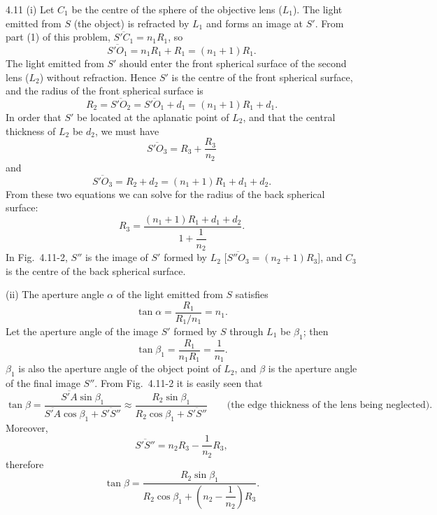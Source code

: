 \begin{solution}{4.11}
(i) Let $C_1$ be the centre of the sphere of the objective lens ($L_1$). The light emitted from $S$
(the object) is refracted by $L_1$ and forms an image at $S'$. From part (1) of this problem,
$\overline{S'C_1}=n_1R_1$, so
\begin{equation*}
\overline{S'O_1} = n_1R_1+R_1 = (n_1+1)R_1.
\end{equation*}
The light emitted from $S'$ should enter the front spherical surface of the second lens ($L_2$)
without refraction. Hence $S'$ is the centre of the front spherical surface, and the radius of the
front spherical surface is
\begin{equation*}
R_2 = \overline{S'O_2} = \overline{S'O_1}+d_1 = (n_1+1)R_1+d_1.
\end{equation*}
In order that $S'$ be located at the aplanatic point of $L_2$, and that the central thickness of
$L_2$ be $d_2$, we must have
\begin{equation*}
\overline{S'O_3} = R_3+\frac{R_3}{n_2}
\end{equation*}
and
\begin{equation*}
\overline{S'O_3} = R_2+d_2 = (n_1+1)R_1+d_1+d_2.
\end{equation*}
From these two equations we can solve for the radius of the back spherical surface:
\begin{equation*}
R_3 = \frac{(n_1+1)R_1+d_1+d_2}{1+\dfrac{1}{n_2}}.
\end{equation*}
In Fig.~4.11-2, $S''$ is the image of $S'$ formed by $L_2$ [$\overline{S''O_3}=(n_2+1)R_3$], and
$C_3$ is the centre of the back spherical surface.

(ii) The aperture angle $\alpha$ of the light emitted from $S$ satisfies
\begin{equation*}
\tan\alpha = \frac{R_1}{R_1/n_1} = n_1.
\end{equation*}
Let the aperture angle of the image $S'$ formed by $S$ through $L_1$ be $\beta_1$; then
\begin{equation*}
\tan\beta_1 = \frac{R_1}{n_1R_1} = \frac{1}{n_1}.
\end{equation*}
$\beta_1$ is also the aperture angle of the object point of $L_2$, and $\beta$ is the aperture angle
of the final image $S''$. From Fig.~4.11-2 it is easily seen that
\begin{equation*}
\tan\beta = \frac{\overline{S'A}\sin\beta_1}{\overline{S'A}\cos\beta_1+\overline{S'S''}}
\approx \frac{R_2\sin\beta_1}{R_2\cos\beta_1+\overline{S'S''}}
\qquad\text{(the edge thickness of the lens being neglected)}.
\end{equation*}
Moreover,
\begin{equation*}
\overline{S'S''} = n_2R_3-\frac{1}{n_2}R_3,
\end{equation*}
therefore
\begin{equation*}
\tan\beta = \frac{R_2\sin\beta_1}{R_2\cos\beta_1+\left(n_2-\dfrac{1}{n_2}\right)R_3}.
\end{equation*}


\end{solution}
